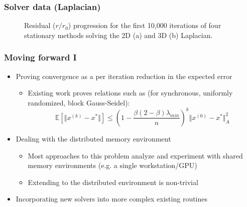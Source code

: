 \documentclass{beamer}
\begin{document}
\begin{frame}
	\frametitle{Solver data (Laplacian)}
	\begin{figure}[H]
		\centering
		\caption{Residual ($r / r_0$) progression for the first 10,000 iterations of four stationary methods solving the 2D (a) and 3D (b) Laplacian.}
	\end{figure}
\end{frame}

\begin{frame}
	\frametitle{Moving forward I}
	\begin{itemize}
		\item Proving convergence as a per iteration reduction in the expected error
		\begin{itemize}
			\item Existing work proves relations such as (for synchronous, uniformly randomized, block Gauss-Seidel):
			\begin{equation}
			\mathbb{E}[\Vert x^{(k)} - x^* \Vert ] \leq \left( 1 - \frac{\beta (2 - \beta) \lambda_{min}}{n}\right)^k \Vert x^{(0)} - x^* \Vert^2_A
			\end{equation}
		\end{itemize}
		\item Dealing with the distributed memory environment
			\begin{itemize}
				\item Most approaches to this problem analyze and experiment with shared memory environments (e.g. a single workstation/GPU)
				\item Extending to the distributed environment is non-trivial
			\end{itemize}
		\item Incorporating new solvers into more complex existing routines
	\end{itemize}
\end{frame}
 
\end{document}
